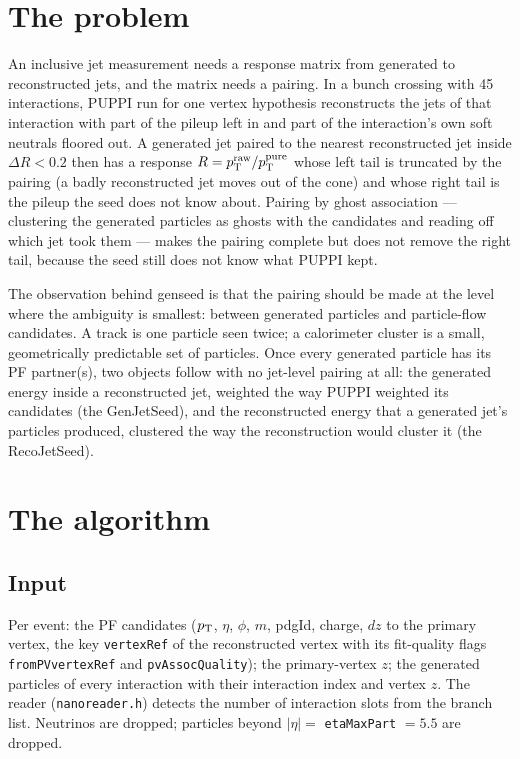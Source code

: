 \section{The problem}
\label{s:problem}

An inclusive jet measurement needs a response matrix from generated to
reconstructed jets, and the matrix needs a pairing. In a bunch crossing with
45 interactions, PUPPI run for one vertex hypothesis reconstructs the jets of
that interaction with part of the pileup left in and part of the interaction's
own soft neutrals floored out. A generated jet paired to the nearest
reconstructed jet inside $\Delta R < 0.2$ then has a response
$R = p_{\mathrm{T}}^{\mathrm{raw}}/p_{\mathrm{T}}^{\mathrm{pure}}$ whose left tail is truncated by the pairing (a badly
reconstructed jet moves out of the cone) and whose right tail is the pileup
the seed does not know about. Pairing by ghost association --- clustering the
generated particles as ghosts with the candidates and reading off which jet
took them --- makes the pairing complete but does not remove the right tail,
because the seed still does not know what PUPPI kept.

The observation behind genseed is that the pairing should be made at the
level where the ambiguity is smallest: between generated particles and
particle-flow candidates. A track is one particle seen twice; a calorimeter
cluster is a small, geometrically predictable set of particles. Once every
generated particle has its PF partner(s), two objects follow with no jet-level
pairing at all: the generated energy inside a reconstructed jet, weighted the
way PUPPI weighted its candidates (the GenJetSeed), and the reconstructed
energy that a generated jet's particles produced, clustered the way the
reconstruction would cluster it (the RecoJetSeed).

\section{The algorithm}
\label{s:algorithm}

\subsection{Input}
Per event: the PF candidates ($p_{\mathrm{T}}$, $\eta$, $\phi$, $m$, pdgId, charge, $dz$
to the primary vertex, the key \texttt{vertexRef} of the reconstructed vertex
with its fit-quality flags \texttt{fromPVvertexRef} and
\texttt{pvAssocQuality}); the
primary-vertex $z$; the generated particles of every interaction with their
interaction index and vertex $z$. The reader (\texttt{nanoreader.h}) detects
the number of interaction slots from the branch list. Neutrinos are dropped;
particles beyond $|\eta| = $ \texttt{etaMaxPart} $= 5.5$ are dropped.

